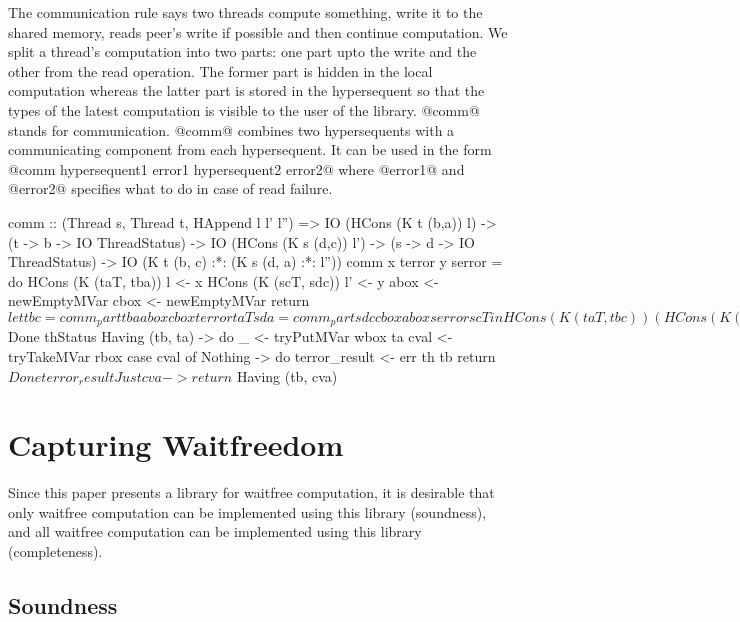The communication rule says two threads compute something, write it to
the shared memory, reads peer's write if possible and then continue
computation. We split a thread's computation into two parts: one part
upto the write and the other from the read operation. The former part is
hidden in the local computation whereas the latter part is stored in the
hypersequent so that the types of the latest computation is visible to
the user of the library.
@comm@ stands for communication.  @comm@ combines two hypersequents with
a communicating component from each hypersequent.
It can be used in the form @comm hypersequent1 error1 hypersequent2
error2@ where @error1@ and
@error2@ specifies what to do in case of read failure.
\begin{code}
comm :: (Thread s, Thread t, HAppend l l' l'') =>
        IO (HCons (K t (b,a)) l)
         -> (t -> b -> IO ThreadStatus)
         -> IO (HCons (K s (d,c)) l')
         -> (s -> d -> IO ThreadStatus)
         -> IO (K t (b, c) :*: (K s (d, a) :*: l''))
comm x terror y serror = do
  HCons (K (taT, tba)) l <- x
  HCons (K (scT, sdc)) l' <- y
  abox <- newEmptyMVar
  cbox <- newEmptyMVar
  return $ let
      tbc = comm_part tba abox cbox terror taT
      sda = comm_part sdc cbox abox serror scT
    in
    HCons (K (taT, tbc))
      (HCons (K (scT, sda)) (hAppend l l'))
    where
      comm_part tba wbox rbox err th = do
            maybeba <- tba
            case maybeba of
              Done thStatus -> return $ Done thStatus
              Having (tb, ta) -> do
                _ <- tryPutMVar wbox ta
                cval <- tryTakeMVar rbox
                case cval of
                  Nothing -> do
                    terror_result <- err th tb
                    return $ Done terror_result
                  Just cva -> return $ Having (tb, cva)
\end{code}

\section{Capturing Waitfreedom}

Since this paper presents a library for waitfree computation, it is
desirable that only waitfree computation can be implemented using this
library (soundness), and all waitfree computation can be implemented
using this library (completeness).

\subsection{Soundness}

